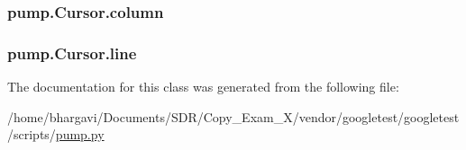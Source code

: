 \subsubsection[{\texorpdfstring{column}{column}}]{\setlength{\rightskip}{0pt plus 5cm}pump.\+Cursor.\+column}\hypertarget{classpump_1_1_cursor_ae73db76c3a845a82afb334633864254e}{}\label{classpump_1_1_cursor_ae73db76c3a845a82afb334633864254e}
\subsubsection[{\texorpdfstring{line}{line}}]{\setlength{\rightskip}{0pt plus 5cm}pump.\+Cursor.\+line}\hypertarget{classpump_1_1_cursor_aee8d8b67360da7fc4e635540cb41d48c}{}\label{classpump_1_1_cursor_aee8d8b67360da7fc4e635540cb41d48c}


The documentation for this class was generated from the following file\+:\begin{DoxyCompactItemize}
\item 
/home/bhargavi/\+Documents/\+S\+D\+R/\+Copy\+\_\+\+Exam\+\_\+X/vendor/googletest/googletest/scripts/\hyperlink{pump_8py}{pump.\+py}\end{DoxyCompactItemize}
